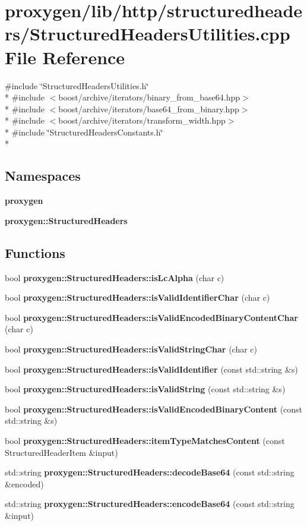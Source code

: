 \section{proxygen/lib/http/structuredheaders/\+Structured\+Headers\+Utilities.cpp File Reference}
\label{StructuredHeadersUtilities_8cpp}
{\ttfamily \#include \char`\"{}Structured\+Headers\+Utilities.\+h\char`\"{}}\\*
{\ttfamily \#include $<$boost/archive/iterators/binary\+\_\+from\+\_\+base64.\+hpp$>$}\\*
{\ttfamily \#include $<$boost/archive/iterators/base64\+\_\+from\+\_\+binary.\+hpp$>$}\\*
{\ttfamily \#include $<$boost/archive/iterators/transform\+\_\+width.\+hpp$>$}\\*
{\ttfamily \#include \char`\"{}Structured\+Headers\+Constants.\+h\char`\"{}}\\*
\subsection*{Namespaces}
\begin{DoxyCompactItemize}
\item 
 {\bf proxygen}
\item 
 {\bf proxygen\+::\+Structured\+Headers}
\end{DoxyCompactItemize}
\subsection*{Functions}
\begin{DoxyCompactItemize}
\item 
bool {\bf proxygen\+::\+Structured\+Headers\+::is\+Lc\+Alpha} (char c)
\item 
bool {\bf proxygen\+::\+Structured\+Headers\+::is\+Valid\+Identifier\+Char} (char c)
\item 
bool {\bf proxygen\+::\+Structured\+Headers\+::is\+Valid\+Encoded\+Binary\+Content\+Char} (char c)
\item 
bool {\bf proxygen\+::\+Structured\+Headers\+::is\+Valid\+String\+Char} (char c)
\item 
bool {\bf proxygen\+::\+Structured\+Headers\+::is\+Valid\+Identifier} (const std\+::string \&s)
\item 
bool {\bf proxygen\+::\+Structured\+Headers\+::is\+Valid\+String} (const std\+::string \&s)
\item 
bool {\bf proxygen\+::\+Structured\+Headers\+::is\+Valid\+Encoded\+Binary\+Content} (const std\+::string \&s)
\item 
bool {\bf proxygen\+::\+Structured\+Headers\+::item\+Type\+Matches\+Content} (const Structured\+Header\+Item \&input)
\item 
std\+::string {\bf proxygen\+::\+Structured\+Headers\+::decode\+Base64} (const std\+::string \&encoded)
\item 
std\+::string {\bf proxygen\+::\+Structured\+Headers\+::encode\+Base64} (const std\+::string \&input)
\end{DoxyCompactItemize}
